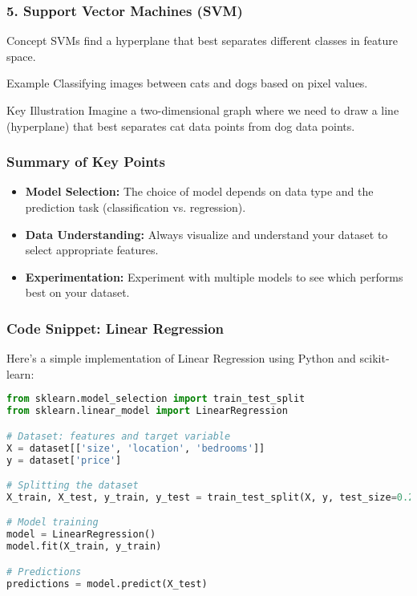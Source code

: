 \documentclass[aspectratio=169]{beamer}
\begin{document}
\begin{frame}[fragile]
    \frametitle{5. Support Vector Machines (SVM)}
    \begin{block}{Concept}
        SVMs find a hyperplane that best separates different classes in feature space.
    \end{block}
    \begin{block}{Example}
        Classifying images between cats and dogs based on pixel values.
    \end{block}
    \begin{block}{Key Illustration}
        Imagine a two-dimensional graph where we need to draw a line (hyperplane) that best separates cat data points from dog data points.
    \end{block}
\end{frame}

\begin{frame}[fragile]
    \frametitle{Summary of Key Points}
    \begin{itemize}
        \item \textbf{Model Selection:} The choice of model depends on data type and the prediction task (classification vs. regression).
        \item \textbf{Data Understanding:} Always visualize and understand your dataset to select appropriate features.
        \item \textbf{Experimentation:} Experiment with multiple models to see which performs best on your dataset.
    \end{itemize}
\end{frame}

\begin{frame}[fragile]
    \frametitle{Code Snippet: Linear Regression}
    Here’s a simple implementation of Linear Regression using Python and scikit-learn:
    \begin{lstlisting}[language=Python]
from sklearn.model_selection import train_test_split
from sklearn.linear_model import LinearRegression

# Dataset: features and target variable
X = dataset[['size', 'location', 'bedrooms']]
y = dataset['price']

# Splitting the dataset
X_train, X_test, y_train, y_test = train_test_split(X, y, test_size=0.2, random_state=42)

# Model training
model = LinearRegression()
model.fit(X_train, y_train)

# Predictions
predictions = model.predict(X_test)
    \end{lstlisting}
\end{frame}
\end{document}
